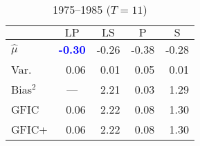 \documentclass[11pt]{article}
\begin{document}
\begin{table}[htbp]
       \centering
     \caption{1975--1985 ($T=11$)}
     \begin{tabular}{lrrrr}\hline\hline 
         & \multicolumn{1}{c}{$\text{LP}$} & \multicolumn{1}{c}{$\text{LS}$} 
          & \multicolumn{1}{c}{$\text{P}$} & \multicolumn{1}{c}{$\text{S}$}\\
        \hline
        $\widehat{\mu}$ & \textcolor{blue}{\textbf{-0.30}} & -0.26 &  -0.38 &  -0.28\\
        Var.\ & 0.06 & 0.01 & 0.05 & 0.01\\ 
        Bias$^2$ & \multicolumn{1}{c}{---} & 2.21 & 0.03 & 1.29\\
        GFIC  &0.06 & 2.22 & 0.08 &  1.30\\
        GFIC+  & 0.06 & 2.22 & 0.08  & 1.30  \\
           \hline
      \end{tabular}
 \end{table}
 
 
\end{document}
